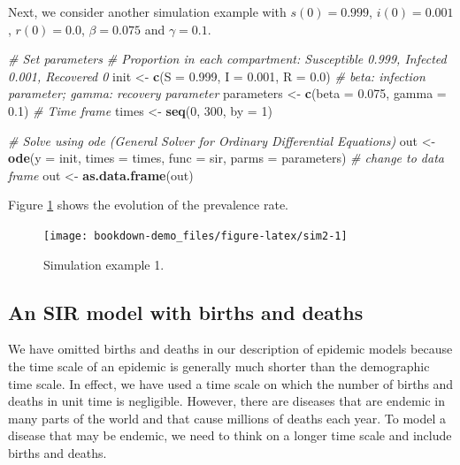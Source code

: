\documentclass[]{book}
\newenvironment{Shaded}{\begin{snugshade}}{\end{snugshade}}
\newcommand{\KeywordTok}[1]{\textcolor[rgb]{0.13,0.29,0.53}{\textbf{#1}}}
\newcommand{\DataTypeTok}[1]{\textcolor[rgb]{0.13,0.29,0.53}{#1}}
\newcommand{\DecValTok}[1]{\textcolor[rgb]{0.00,0.00,0.81}{#1}}
\newcommand{\FloatTok}[1]{\textcolor[rgb]{0.00,0.00,0.81}{#1}}
\newcommand{\StringTok}[1]{\textcolor[rgb]{0.31,0.60,0.02}{#1}}
\newcommand{\CommentTok}[1]{\textcolor[rgb]{0.56,0.35,0.01}{\textit{#1}}}
\newcommand{\NormalTok}[1]{#1}
\begin{document}
Next, we consider another simulation example with \(s(0)=0.999\),
\(i(0)=0.001\), \(r(0)=0.0\), \(\beta=0.075\) and \(\gamma=0.1\).

\begin{Shaded}
\begin{Highlighting}[]
\CommentTok{# Set parameters}
\CommentTok{# Proportion in each compartment: Susceptible 0.999, Infected 0.001, Recovered 0}
\NormalTok{init <-}\StringTok{ }\KeywordTok{c}\NormalTok{(}\DataTypeTok{S =} \FloatTok{0.999}\NormalTok{, }\DataTypeTok{I =} \FloatTok{0.001}\NormalTok{, }\DataTypeTok{R =} \FloatTok{0.0}\NormalTok{)}
\CommentTok{# beta: infection parameter; gamma: recovery parameter}
\NormalTok{parameters <-}\StringTok{ }\KeywordTok{c}\NormalTok{(}\DataTypeTok{beta =} \FloatTok{0.075}\NormalTok{, }\DataTypeTok{gamma =} \FloatTok{0.1}\NormalTok{)}
\CommentTok{# Time frame}
\NormalTok{times <-}\StringTok{ }\KeywordTok{seq}\NormalTok{(}\DecValTok{0}\NormalTok{, }\DecValTok{300}\NormalTok{, }\DataTypeTok{by =} \DecValTok{1}\NormalTok{)}

\CommentTok{# Solve using ode (General Solver for Ordinary Differential Equations)}
\NormalTok{out <-}\StringTok{ }\KeywordTok{ode}\NormalTok{(}\DataTypeTok{y =}\NormalTok{ init, }\DataTypeTok{times =}\NormalTok{ times, }\DataTypeTok{func =}\NormalTok{ sir, }\DataTypeTok{parms =}\NormalTok{ parameters)}
\CommentTok{# change to data frame}
\NormalTok{out <-}\StringTok{ }\KeywordTok{as.data.frame}\NormalTok{(out)}
\end{Highlighting}
\end{Shaded}

Figure \ref{fig:sim2} shows the evolution of the prevalence rate.

\begin{figure}

{\centering \texttt{[image: bookdown-demo\_files/figure-latex/sim2-1]} 

}

\caption{Simulation example 1.}\label{fig:sim2}
\end{figure}

\subsection{An SIR model with births and
deaths}\label{an-sir-model-with-births-and-deaths}

We have omitted births and deaths in our description of epidemic models
because the time scale of an epidemic is generally much shorter than the
demographic time scale. In effect, we have used a time scale on which
the number of births and deaths in unit time is negligible. However,
there are diseases that are endemic in many parts of the world and that
cause millions of deaths each year. To model a disease that may be
endemic, we need to think on a longer time scale and include births and
deaths.
\end{document}
